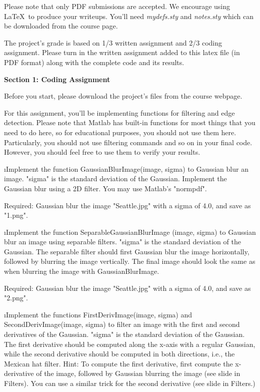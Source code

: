 \documentclass[fleqn]{article}
\begin{document}


Please note that only PDF submissions are accepted. We encourage using \LaTeX\ to produce your writeups. You'll need {\em mydefs.sty} and {\em notes.sty} which can be downloaded from the course page.

The project's grade is based on 1/3 written assignment and 2/3 coding assignment. Please turn in the written assignment added to this latex file (in PDF format) along with the complete code and its results.

{\bf Section 1: Coding Assignment} 
 
Before you start, please download the project's files from the course webpage.

For this assignment, you'll be implementing functions for filtering and edge detection. Please note that Matlab has built-in functions for most things that you need to do here, so for educational purposes, you should not use them here. Particularly, you should not use filtering commands and so on in your final code. However, you should feel free to use them to verify your results.
 
\bee
\i Implement the function GaussianBlurImage(image, sigma) to Gaussian blur an image. "sigma" is the standard deviation of the Gaussian. Implement the Gaussian blur using a 2D filter. You may use Matlab's "normpdf".
 
Required: Gaussian blur the image "Seattle.jpg" with a sigma of 4.0, and save as "1.png".
 
\i Implement the function SeparableGaussianBlurImage (image, sigma) to Gaussian blur an image using separable filters. "sigma" is the standard deviation of the Gaussian. The separable filter should first Gaussian blur the image horizontally, followed by blurring the image vertically. The final image should look the same as when blurring the image with GaussianBlurImage.
 
Required: Gaussian blur the image "Seattle.jpg" with a sigma of 4.0, and save as "2.png".
 
\i Implement the functions FirstDerivImage(image, sigma) and SecondDerivImage(image, sigma) to filter an image with the first and second derivatives of the Gaussian. "sigma" is the standard deviation of the Gaussian. The first derivative should be computed along the x-axis with a regular Gaussian, while the second derivative should be computed in both directions, i.e., the Mexican hat filter. Hint: To compute the first derivative, first compute the x-derivative of the image, followed by Gaussian blurring the image (see slide in Filters). You can use a similar trick for the second derivative (see slide in Filters.)
 
\end{document}

